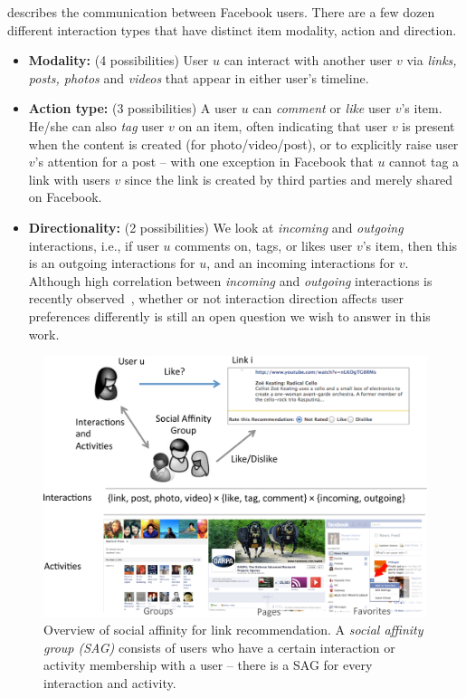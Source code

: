 describes the communication between Facebook users. There are a few dozen different interaction types that have distinct item modality, action and direction.
\begin{itemize}
\item \textbf{Modality:} (4 possibilities)
User $u$ can interact with another user $v$ via \textit{links, posts, photos} and \textit{videos} that appear in either user's timeline.

\item \textbf{Action type:} (3 possibilities)
A user $u$ can \textit{comment} or \textit{like} 
user $v$'s item. He/she can also \textit{tag} user $v$ on an 
item, often indicating that user $v$ is present when the content is created (for photo/video/post), 
or to explicitly raise user $v$'s attention for a post -- with one exception in Facebook that $u$ cannot tag a link with users $v$ since the link is created by third parties and merely shared on Facebook.

\item \textbf{Directionality:} (2 possibilities)
We look at \textit{incoming} and \textit{outgoing} interactions, i.e.,
if user $u$ comments on, tags, or likes user $v$'s item,
then this is an outgoing interactions for $u$, and an incoming interactions for $v$.
Although high correlation between \textit{incoming} and \textit{outgoing} interactions 
is recently observed~\cite{saez2011high}, whether or not interaction direction 
affects user preferences differently is still an open question we wish to answer
in this work. 
      								
\end{itemize}

\begin{figure}[t!]
\centering
\includegraphics[width=.95\linewidth]{data/overview}
\caption{Overview of social affinity for link recommendation.
A \emph{social affinity group (SAG)} consists of users who have a
certain interaction or activity membership with a user -- there
is a SAG for every interaction and activity.}
\label{fig:overview}
\end{figure}

